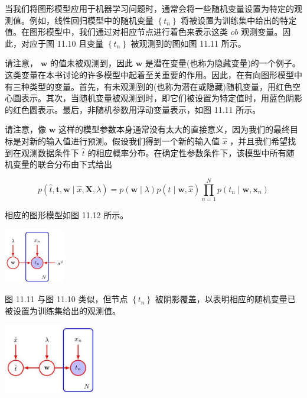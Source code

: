 \documentclass[10pt]{report}
\begin{document}
当我们将图形模型应用于机器学习问题时，通常会将一些随机变量设置为特定的观测值。例如，线性回归模型中的随机变量 \(\left\{  {t}_{n}\right\}\) 将被设置为训练集中给出的特定值。在图形模型中，我们通过对相应节点进行着色来表示这类 \({ob}\) 观测变量。因此，对应于图 11.10 且变量 \(\left\{  {t}_{n}\right\}\) 被观测到的图如图 11.11 所示。

请注意， \(\mathbf{w}\) 的值未被观测到，因此 \(\mathbf{w}\) 是潜在变量(也称为隐藏变量)的一个例子。这类变量在本书讨论的许多模型中起着至关重要的作用。因此，在有向图形模型中有三种类型的变量。首先，有未观测到的(也称为潜在或隐藏)随机变量，用红色空心圆表示。其次，当随机变量被观测到时，即它们被设置为特定值时，用蓝色阴影的红色圆表示。最后，非随机参数用浮动变量表示，如图 11.11 所示。

请注意，像 \(\mathbf{w}\) 这样的模型参数本身通常没有太大的直接意义，因为我们的最终目标是对新的输入值进行预测。假设我们得到一个新的输入值 \(\widehat{x}\) ，并且我们希望找到在观测数据条件下 \(\widehat{t}\) 的相应概率分布。在确定性参数条件下，该模型中所有随机变量的联合分布由下式给出

\[
p\left( {\widehat{t},\mathbf{t},\mathbf{w} \mid  \widehat{x},\mathbf{X},\lambda }\right)  = p\left( {\mathbf{w} \mid  \lambda }\right) p\left( {\widehat{t} \mid  \mathbf{w},\widehat{x}}\right) \mathop{\prod }\limits_{{n = 1}}^{N}p\left( {{t}_{n} \mid  \mathbf{w},{\mathbf{x}}_{n}}\right)  \tag{11.19}
\]

相应的图形模型如图 11.12 所示。

\begin{center}
\includegraphics[max width=0.2\textwidth]{images/0194e279-9b28-703a-88f4-c3ac21e2010d_354_1222_1716_320_287_0.jpg}
\end{center}
\hspace*{3em} 

图 11.11 与图 11.10 类似，但节点 \(\left\{  {t}_{n}\right\}\) 被阴影覆盖，以表明相应的随机变量已被设置为训练集给出的观测值。

\begin{center}
\includegraphics[max width=0.3\textwidth]{images/0194e279-9b28-703a-88f4-c3ac21e2010d_355_1178_345_371_283_0.jpg}
\end{center}
\hspace*{3em} 
\end{document}
